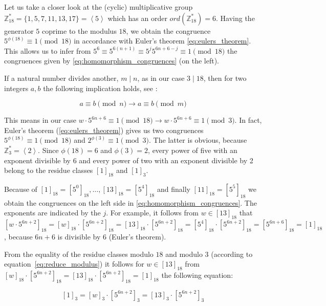
Let us take a closer look at the (cyclic) multiplicative group $\mathbb{Z}^\ast_{18}=\{1,5,7,11,13,17\}=\left<5\right>$ which has an order $ord(\mathbb{Z}^\ast_{18})=6$. Having the generator $5$ coprime to the modulus $18$, we obtain the congruence $5^{\phi(18)}\equiv1\pmod{18}$ in accordance with Euler's theorem \ref{eq:eulers_theorem}. This allows us to infer from $5^6\equiv5^{6(n+1)}\equiv5^j5^{6n+6-j}\equiv1\pmod{18}$ the congruences given by \ref{eq:homomorphism_congruences} (on the left).

If a natural number divides another, $m\mid n$, as in our case $3\mid18$, then for two integers $a,b$ the following implication holds, see \cite[p.~21]{Ref_Mueller-Stach_2011}:

\begin{equation}
	\label{eq:reduce_modulus}
	a\equiv b\pmod n\rightarrow a\equiv b\pmod m
\end{equation}

This means in our case $w\cdot5^{6n+6}\equiv 1\pmod{18}\rightarrow w\cdot5^{6n+6}\equiv 1\pmod 3$.
In fact, Euler's theorem (\ref{eq:eulers_theorem}) gives us two congruences $5^{\phi(18)}\equiv1\pmod{18}$ and $2^{\phi(3)}\equiv1\pmod{3}$. The latter is obvious, because $\mathbb{Z}_3^\ast=\left<2\right>$. Since $\phi(18)=6$ and $\phi(3)=2$, every power of five with an exponent divisible by $6$ and every power of two with an exponent divisible by 2 belong to the residue classes $[1]_{18}$ and $[1]_3$.

Because of $[1]_{18}=[5^0]_{18},\ldots,[13]_{18}=[5^4]_{18}$ and finally $[11]_{18}=[5^5]_{18}$ we obtain the congruences on the left side in \ref{eq:homomorphism_congruences}. The exponents are indicated by the $j$. For example, it follows from $w\in[13]_{18}$ that $[w\cdot5^{6n+2}]_{18}=[w]_{18}\cdot[5^{6n+2}]_{18}=[13]_{18}\cdot[5^{6n+2}]_{18}=[5^4]_{18}\cdot[5^{6n+2}]_{18}=[5^{6n+6}]_{18}=[1]_{18}$, because $6n+6$ is divisible by $6$ (Euler's theorem).

From the equality of the residue classes modulo $18$ and modulo $3$ (according to equation~\ref{eq:reduce_modulus}) it follows for $w\in[13]_{18}$ from $[w]_{18}\cdot[5^{6n+2}]_{18}=[13]_{18} \cdot[5^{6n+2}]_{18}=[1]_{18}$ the following equation:

\begin{equation}
\label{eq:mod_18_3}
[1]_3=[w]_3\cdot[5^{6n+2}]_3=[13]_3\cdot[5^{6n+2}]_3
\end{equation}

